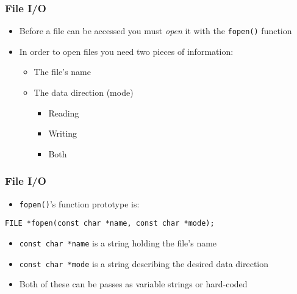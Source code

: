 \documentclass[14pt]{beamer}
\begin{document}
\begin{frame}[fragile]
\frametitle{File I/O}
\begin{itemize}
\item Before a file can be accessed you must \textit{open} it with the \texttt{fopen()} function
\item In order to open files you need two pieces of information:
	\begin{itemize}
		\item The file's name
		\item The data direction (mode)
			\begin{itemize}
				\item Reading
				\item Writing
				\item Both
			\end{itemize}
	\end{itemize}
\end{itemize}
\end{frame}

\begin{frame}[fragile]
\frametitle{File I/O}
\begin{itemize}
\item \texttt{fopen()}'s function prototype is:
\end{itemize}
\begin{lstlisting}[style=CStyle]
FILE *fopen(const char *name, const char *mode);
\end{lstlisting}
\begin{itemize}
\item \texttt{const char *name} is a string holding the file's name
\item \texttt{const char *mode} is a string describing the desired data direction
\item Both of these can be passes as variable strings or hard-coded
\end{itemize}
\end{frame}
\end{document}
